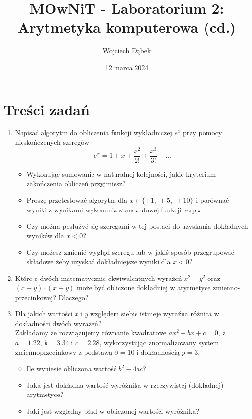 \documentclass{article}
\title{MOwNiT - Laboratorium 2: \\
Arytmetyka komputerowa (cd.)}
\author{Wojciech Dąbek}
\date{12 marca 2024}
\begin{document}
\maketitle

\section{Treści zadań}

\begin{enumerate}
    \item Napisać algorytm do obliczenia funkcji wykładniczej \(e^x\) przy pomocy nieskończonych szeregów
    \[e^x = 1+x + \frac{x^2}{2!} + \frac{x^3}{3!} + \ldots\]
    \begin{itemize}
        \item Wykonując sumowanie w naturalnej kolejności, jakie kryterium zakończenia obliczeń przyjmiesz?
        \item Proszę przetestować algorytm dla \(x \in \{\pm1,\ \pm5,\ \pm10\}\) i porównać wyniki z wynikami wykonania standardowej funkcji \(\exp x\).
        \item Czy można posłużyć się szeregami w tej postaci do uzyskania dokładnych wyników dla \(x < 0\)?
        \item Czy możesz zmienić wygląd szeregu lub w jakiś sposób przegrupować składowe żeby uzyskać dokładniejsze wyniki dla \(x < 0\)?
    \end{itemize}
    \item Które z dwóch matematycznie ekwiwalentnych wyrażeń \(x^2 - y^2\) oraz\\
    \((x - y)\cdot(x + y)\) może być obliczone dokładniej w arytmetyce zmienno-przecinkowej? Dlaczego?
    \item Dla jakich wartości \textit{x} i \textit{y} względem siebie istnieje wyraźna różnica w dokładności dwóch wyrażeń?\\
    Zakładamy że rozwiązujemy równanie kwadratowe \(ax^2 + bx + c = 0\), z \(a = 1.22,\ b = 3.34\) i \(c = 2.28\), wykorzystując znormalizowany system zmiennoprzecinkowy z podstawą \(\beta = 10\) i dokładnością \(p = 3\).
    \begin{itemize}
        \item Ile wyniesie obliczona wartość \(b^2 - 4ac\)?
        \item Jaka jest dokładna wartość wyróżnika w rzeczywistej (dokładnej) arytmetyce?
        \item Jaki jest względny błąd w obliczonej wartości wyróżnika?
    \end{itemize}
\end{enumerate}
\end{document}
